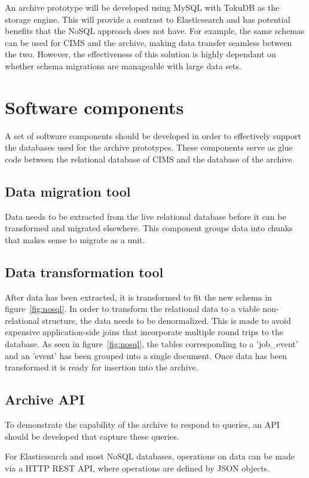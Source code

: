 An archive prototype will be developed using MySQL with TokuDB as the storage engine. This will provide a contrast to Elasticsearch and has potential benefits that the NoSQL approach does not have. For example, the same schemas can be used for CIMS and the archive, making data transfer seamless between the two. However, the effectiveness of this solution is highly dependant on whether schema migrations are manageable with large data sets.

\section{Software components}
A set of software components should be developed in order to effectively support the databases used for the archive prototypes. These components serve as glue code between the relational database of CIMS and the database of the archive. 
\subsection{Data migration tool}
Data needs to be extracted from the live relational database before it can be transformed and migrated elsewhere. This component groups data into chunks that makes sense to migrate as a unit. 

\subsection{Data transformation tool}
After data has been extracted, it is transformed to fit the new schema in figure~\ref{fig:nosql}. In order to transform the relational data to a viable non-relational structure, the data needs to be denormalized. This is made to avoid expensive application-side joins that incorporate multiple round trips to the database. As seen in figure~\ref{fig:nosql}, the tables corresponding to a 'job\_event' and an 'event' has been grouped into a single document. Once data has been transformed it is ready for insertion into the archive. 

\subsection{Archive API}
\label{sec:archiveapi}
To demonstrate the capability of the archive to respond to queries, an API should be developed that capture these queries. 

For Elasticsearch and most NoSQL databases, operations on data can be made via a HTTP REST API, where operations are defined by JSON objects.

